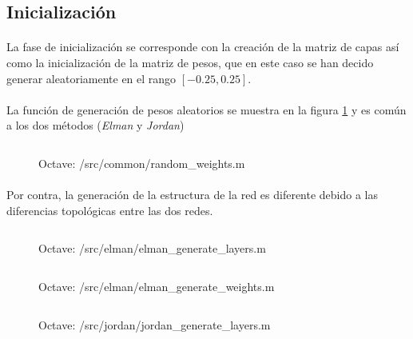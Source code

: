 \documentclass[10pt, a4paper,spanish]{article}
\begin{document}
		\subsection{Inicialización}

			\paragraph{}
			La fase de inicialización se corresponde con la creación de la matriz de capas así como la inicialización de la matriz de pesos, que en este caso se han decido generar aleatoriamente en el rango $[-0.25,0.25]$.

			\paragraph{}
			La función de generación de pesos aleatorios se muestra en la figura \ref{code:random_weights} y es común a los dos métodos (\emph{Elman} y \emph{Jordan})

			\begin{figure}[htpb!]
				\centering
				\inputminted{octave}{../src/common/random_weights.m}
				\caption{Octave: /src/common/random\_weights.m}
				\label{code:random_weights}
			\end{figure}

			\paragraph{}
			Por contra, la generación de la estructura de la red es diferente debido a las diferencias topológicas entre las dos redes.

			\begin{figure}[htpb!]
				\centering
				\inputminted{octave}{../src/elman/elman_generate_layers.m}
				\caption{Octave: /src/elman/elman\_generate\_layers.m}
				\label{code:jordan_generate_layers}
			\end{figure}

			\begin{figure}[htpb!]
				\centering
				\inputminted{octave}{../src/elman/elman_generate_weights.m}
				\caption{Octave: /src/elman/elman\_generate\_weights.m}
				\label{code:elman_generate_weights}
			\end{figure}

			\begin{figure}[htpb!]
				\centering
				\inputminted{octave}{../src/jordan/jordan_generate_layers.m}
				\caption{Octave: /src/jordan/jordan\_generate\_layers.m}
				\label{code:jordan_generate_layers}
			\end{figure}
\end{document}

